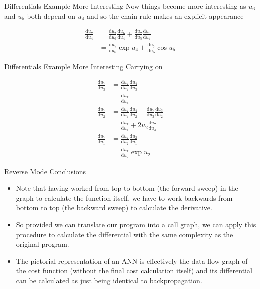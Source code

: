 \documentclass{beamer}
\begin{document}
\begin{frame}[fragile]{Differentials Example More Interesting}
Now things become more interesting as $u_6$ and $u_5$ both depend on
$u_4$ and so the chain rule makes an explicit appearance

$$
\begin{aligned}
\frac{\mathrm{d}u_7}{\mathrm{d}u_4} &=
 \frac{\mathrm{d}u_7}{\mathrm{d}u_6}\frac{\mathrm{d}u_6}{\mathrm{d}u_4} +
 \frac{\mathrm{d}u_7}{\mathrm{d}u_5}\frac{\mathrm{d}u_5}{\mathrm{d}u_4} \\
&= \frac{\mathrm{d}u_7}{\mathrm{d}u_6}\exp{u_4} +
   \frac{\mathrm{d}u_7}{\mathrm{d}u_5}\cos{u_5}
\end{aligned}
$$
\end{frame}

\begin{frame}[fragile]{Differentials Example More Interesting}
Carrying on

$$
\begin{aligned}
\frac{\mathrm{d}u_7}{\mathrm{d}u_3} &=
 \frac{\mathrm{d}u_7}{\mathrm{d}u_4}\frac{\mathrm{d}u_4}{\mathrm{d}u_3} \\
&= \frac{\mathrm{d}u_7}{\mathrm{d}u_4} \\
\frac{\mathrm{d}u_7}{\mathrm{d}u_2} &=
 \frac{\mathrm{d}u_7}{\mathrm{d}u_4}\frac{\mathrm{d}u_4}{\mathrm{d}u_2} +
 \frac{\mathrm{d}u_7}{\mathrm{d}u_3}\frac{\mathrm{d}u_3}{\mathrm{d}u_2} \\
&= \frac{\mathrm{d}u_7}{\mathrm{d}u_4} + 2u_2\frac{\mathrm{d}u_7}{\mathrm{d}u_4} \\
\frac{\mathrm{d}u_7}{\mathrm{d}u_1} &=
 \frac{\mathrm{d}u_7}{\mathrm{d}u_2}\frac{\mathrm{d}u_2}{\mathrm{d}u_1} \\
&=\frac{\mathrm{d}u_7}{\mathrm{d}u_2}\exp{u_2}
\end{aligned}
$$
\end{frame}

\begin{frame}[fragile]{Reverse Mode Conclusions}
\begin{itemize}
\item
Note that having worked from top to bottom (the forward sweep) in the
graph to calculate the function itself, we have to work backwards from
bottom to top (the backward sweep) to calculate the derivative.
\item
So provided we can translate our program into a call graph, we can
apply this procedure to calculate the differential with the same
complexity as the original program.
\item
The pictorial representation of an ANN is effectively the data flow
graph of the cost function (without the final cost calculation itself)
and its differential can be calculated as just being identical to
backpropagation.
\end{itemize}
\end{frame}
\end{document}
